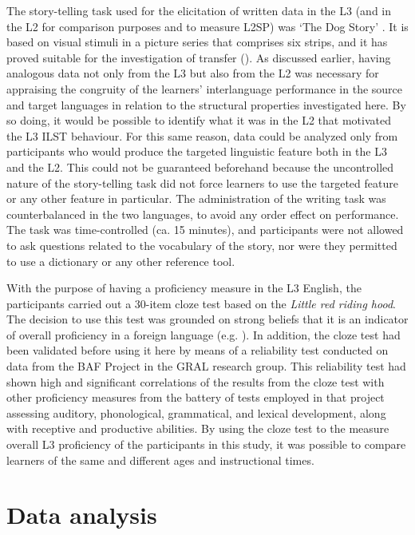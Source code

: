 \documentclass[output=paper,modfonts,nonflat, newtxmath]{langsci/langscibook}
\begin{document}
The story-telling task used for the elicitation of written data in the L3 (and in the L2 for comparison purposes and to measure L2SP) was ‘The Dog Story’ \citep{Heaton1966}. It is based on visual stimuli in a picture series that comprises six strips, and it has proved suitable for the investigation of transfer (\citealt{SánchezJarvis2008}). As discussed earlier, having analogous data not only from the L3 but also from the L2 was necessary for appraising the congruity of the learners’ interlanguage performance \citep[55]{Jarvis2000} in the source and target languages in relation to the structural properties investigated here. By so doing, it would be possible to identify what it was in the L2 that motivated the L3 ILST behaviour. For this same reason, data could be analyzed only from participants who would produce the targeted linguistic feature both in the L3 and the L2. This could not be guaranteed beforehand because the uncontrolled nature of the story-telling task did not force learners to use the targeted feature or any other feature in particular. The administration of the writing task was counterbalanced in the two languages,  to avoid any order effect on performance. The task was time-controlled (ca. 15 minutes), and participants were not allowed to ask questions related to the vocabulary of the story, nor were they permitted to use a dictionary or any other reference tool.

With the purpose of having a proficiency measure in the L3 English, the participants carried out a 30-item cloze test based on the \textit{Little red riding hood}. The decision to use this test was grounded on strong beliefs that it is an indicator of overall proficiency in a foreign language (e.g. \citealt{Hanzeli1977, KatonaDornyei1993}). In addition, the cloze test had been validated before using it here \citep{Muñoz2006} by means of a reliability test conducted on data from the BAF Project in the GRAL research group. This reliability test had shown high and significant correlations of the results from the cloze test with other proficiency measures from the battery of tests employed in that project assessing auditory, phonological, grammatical, and lexical development, along with receptive and productive abilities. By using the cloze test to the measure overall L3 proficiency of the participants in this study, it was possible to compare learners of the same and different ages and instructional times.

\section{Data analysis}
\end{document}
